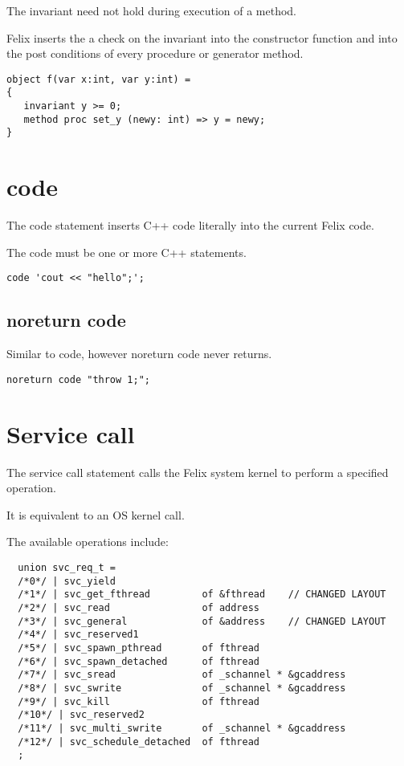 \documentclass[oneside]{book}
\begin{document}
{The invariant need not hold during execution of a method.

Felix inserts the a check on the invariant into the constructor function
and into the post conditions of every procedure or generator
method.


\begin{verbatim}
object f(var x:int, var y:int) =
{
   invariant y >= 0;
   method proc set_y (newy: int) => y = newy;
}
\end{verbatim}


\section{code}
The code statement inserts C++ code literally into the current
Felix code.

The code must be one or more C++ statements.


\begin{verbatim}
code 'cout << "hello";';
\end{verbatim}


\subsection{noreturn code}
Similar to code, however noreturn code never returns.

\begin{verbatim}
noreturn code "throw 1;";
\end{verbatim}


\section{Service call}
The service call statement calls the Felix system kernel
to perform a specified operation.

It is equivalent to an OS kernel call.

The available operations include:

\begin{verbatim}
  union svc_req_t =
  /*0*/ | svc_yield
  /*1*/ | svc_get_fthread         of &fthread    // CHANGED LAYOUT
  /*2*/ | svc_read                of address
  /*3*/ | svc_general             of &address    // CHANGED LAYOUT
  /*4*/ | svc_reserved1
  /*5*/ | svc_spawn_pthread       of fthread
  /*6*/ | svc_spawn_detached      of fthread
  /*7*/ | svc_sread               of _schannel * &gcaddress
  /*8*/ | svc_swrite              of _schannel * &gcaddress
  /*9*/ | svc_kill                of fthread
  /*10*/ | svc_reserved2
  /*11*/ | svc_multi_swrite       of _schannel * &gcaddress 
  /*12*/ | svc_schedule_detached  of fthread
  ;
\end{verbatim}


}
\end{document}
